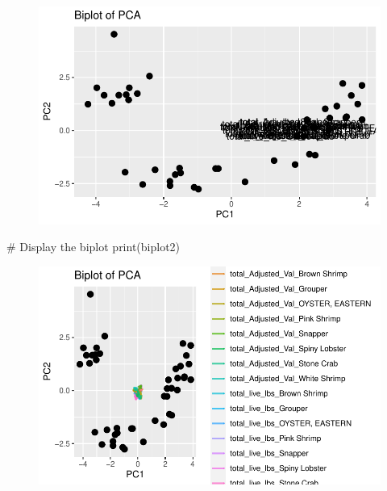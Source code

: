 \documentclass[
  letterpaper,
  DIV=11,
  numbers=noendperiod]{scrartcl}
\newenvironment{Shaded}{\begin{snugshade}}{\end{snugshade}}
\newcommand{\CommentTok}[1]{\textcolor[rgb]{0.37,0.37,0.37}{#1}}
\newcommand{\FunctionTok}[1]{\textcolor[rgb]{0.28,0.35,0.67}{#1}}
\newcommand{\NormalTok}[1]{\textcolor[rgb]{0.00,0.23,0.31}{#1}}
\begin{document}
\begin{figure}[H]

{\centering \includegraphics{PCA_all_data_files/figure-pdf/unnamed-chunk-7-1.pdf}

}

\end{figure}

\begin{Shaded}
\begin{Highlighting}[]
\CommentTok{\# Display the biplot}
\FunctionTok{print}\NormalTok{(biplot2)}
\end{Highlighting}
\end{Shaded}

\begin{figure}[H]

{\centering \includegraphics{PCA_all_data_files/figure-pdf/unnamed-chunk-7-2.pdf}

}

\end{figure}
\end{document}
